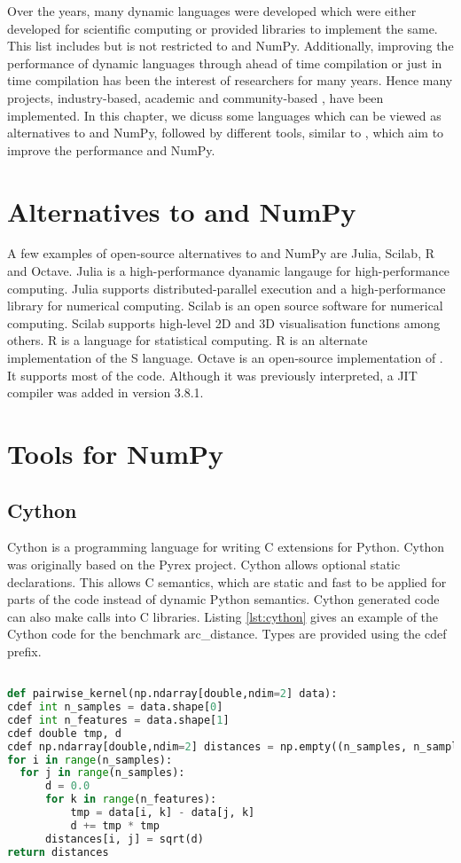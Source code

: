Over the years, many dynamic languages were developed which were either developed for scientific computing or provided libraries to implement the same. This list includes but is not restricted to \matlab\cite{matlab} and NumPy\cite{numpy}. Additionally, improving the performance of dynamic languages through ahead of time compilation or just in time compilation has been the interest of researchers for many years. Hence many projects, industry-based, academic and community-based , have been implemented. In this chapter, we dicuss some languages which can be viewed as alternatives to \matlab and NumPy, followed by different tools, similar to \velocty, which aim to improve the performance \matlab and NumPy.
\section{Alternatives to \matlab and NumPy}
A few examples of open-source alternatives to \matlab and NumPy are Julia\cite{julia}, Scilab\cite{scilab}, R\cite{rlang} and Octave\cite{octave}. Julia is a high-performance dyanamic langauge for high-performance computing. Julia supports distributed-parallel execution and a high-performance library for numerical computing. Scilab is an open source software for numerical computing. Scilab supports high-level 2D and 3D visualisation functions among others. R is a language for statistical computing. R is an alternate implementation of the S language. Octave is an open-source implementation of \matlab. It supports most of the \matlab code. Although it was previously interpreted, a JIT compiler was added in version 3.8.1.
\section{Tools for NumPy}
\subsection{Cython}
Cython is a programming language for writing C extensions for Python. Cython was originally based on the Pyrex project\cite{pyrex}.  Cython allows optional static declarations. This allows C semantics, which are static and fast to be applied for parts of the code instead of dynamic Python semantics. Cython generated code can also make calls into C libraries. Listing \ref{lst:cython} gives an example of the Cython code for the benchmark arc\_distance. Types are provided using the \textsf{cdef} prefix. 

\begin{lstlisting}[language=python, label={lst:cython}, caption={ The Cython code with static type annotations that will is taken as input by Cython to generate C code. The example is of the arc\_distance benchmark}]

def pairwise_kernel(np.ndarray[double,ndim=2] data):
cdef int n_samples = data.shape[0]
cdef int n_features = data.shape[1]
cdef double tmp, d
cdef np.ndarray[double,ndim=2] distances = np.empty((n_samples, n_samples))
for i in range(n_samples):
  for j in range(n_samples):
	  d = 0.0
	  for k in range(n_features):
		  tmp = data[i, k] - data[j, k]
		  d += tmp * tmp
	  distances[i, j] = sqrt(d)
return distances
\end{lstlisting}

